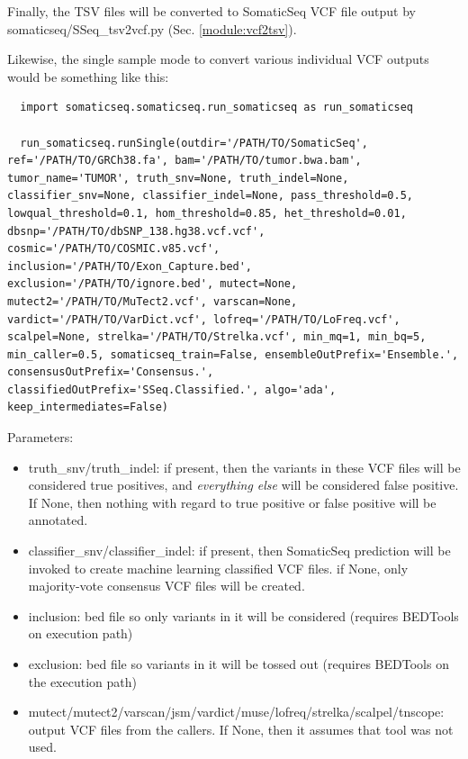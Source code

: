 \documentclass[10pt,letterpaper]{article}
\begin{document}
\begin{sloppypar}
Finally, the TSV files will be converted to SomaticSeq VCF file output by somaticseq/SSeq\_tsv2vcf.py (Sec. \ref{module:vcf2tsv}). 



Likewise, the single sample mode to convert various individual VCF outputs would be something like this:

\begin{lstlisting}
  import somaticseq.somaticseq.run_somaticseq as run_somaticseq
  
  run_somaticseq.runSingle(outdir='/PATH/TO/SomaticSeq', ref='/PATH/TO/GRCh38.fa', bam='/PATH/TO/tumor.bwa.bam', tumor_name='TUMOR', truth_snv=None, truth_indel=None, classifier_snv=None, classifier_indel=None, pass_threshold=0.5, lowqual_threshold=0.1, hom_threshold=0.85, het_threshold=0.01, dbsnp='/PATH/TO/dbSNP_138.hg38.vcf.vcf', cosmic='/PATH/TO/COSMIC.v85.vcf', inclusion='/PATH/TO/Exon_Capture.bed', exclusion='/PATH/TO/ignore.bed', mutect=None, mutect2='/PATH/TO/MuTect2.vcf', varscan=None, vardict='/PATH/TO/VarDict.vcf', lofreq='/PATH/TO/LoFreq.vcf', scalpel=None, strelka='/PATH/TO/Strelka.vcf', min_mq=1, min_bq=5, min_caller=0.5, somaticseq_train=False, ensembleOutPrefix='Ensemble.', consensusOutPrefix='Consensus.', classifiedOutPrefix='SSeq.Classified.', algo='ada', keep_intermediates=False)
\end{lstlisting}


Parameters:

\begin{itemize}

\item truth\_snv/truth\_indel: if present, then the variants in these VCF files will be considered true positives, and \emph{everything else} will be considered false positive. If None, then nothing with regard to true positive or false positive will be annotated. 

\item classifier\_snv/classifier\_indel: if present, then SomaticSeq prediction will be invoked to create machine learning classified VCF files. if None, only majority-vote consensus VCF files will be created. 

\item inclusion: bed file so only variants in it will be considered (requires BEDTools on execution path)

\item exclusion: bed file so variants in it will be tossed out (requires BEDTools on the execution path)

\item mutect/mutect2/varscan/jsm/vardict/muse/lofreq/strelka/scalpel/tnscope: output VCF files from the callers. If None, then it assumes that tool was not used. 


\end{itemize}
\end{sloppypar}
\end{document}
